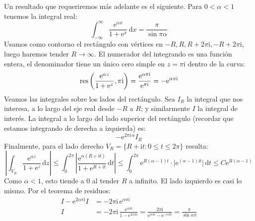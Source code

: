   Un resultado que requeriremos más adelante es el siguiente.
  Para \(0 < \alpha < 1\) tenemos la integral real:
  \begin{equation}
    \label{eq:integral-Gamma(z)Gamma(1-z)}
    \int_{-\infty}^\infty
      \frac{\mathrm{e}^{\alpha x}}{1 + \mathrm{e}^x}
	 \, \mathrm{d} x
      = \frac{\pi}{\sin \pi \alpha}
  \end{equation}
  Usamos como contorno
  el rectángulo con vértices en
  \(-R, R, R + 2 \pi \mathrm{i}, -R + 2 \pi \mathrm{i}\),
  luego haremos tender \(R \rightarrow \infty\).
  El numerador del integrando es una función entera,
  el denominador tiene un único cero simple
  en \(z = \pi \mathrm{i}\)
  dentro de la curva:
  \begin{equation*}
    \operatorname{res} \left(
	   \frac{\mathrm{e}^{\alpha z}}{1 + \mathrm{e}^z},
	   \pi \mathrm{i}
	 \right)
      = \frac{\mathrm{e}^{\alpha \pi \mathrm{i}}}
	     {\mathrm{e}^{\pi \mathrm{i}}}
      = - \mathrm{e}^{\alpha \pi \mathrm{i}}
  \end{equation*}
  Veamos las integrales sobre los lados del rectángulo.
  Sea \(I_R\) la integral que nos interesa,
  a lo largo del eje real desde \(-R\) a \(R\);
  y similarmente \(I\) la integral de interés.
  La integral a lo largo del lado superior del rectángulo
  (recordar que estamos integrando de derecha a izquierda)
  es:
  \begin{equation*}
    - \mathrm{e}^{2 \pi \mathrm{i} \, \alpha} I_R
  \end{equation*}
  Finalmente,
  para el lado derecho
    \(V_R = \{ R + \mathrm{i} t \colon 0 \le t \le 2\pi \}\)
  resulta:
  \begin{equation*}
    \left\lvert
      \int_{V_R}
	\frac{\mathrm{e}^{\alpha z}}{1 + \mathrm{e}^z}
	\, \mathrm{d} z
    \right\rvert
      \le \int_0^{2 \pi}
	    \left\lvert
	      \frac{\mathrm{e}^{\alpha (R + \mathrm{i} t)}}
		   {1 + \mathrm{e}^{R + \mathrm{i} t}}
	      \, \mathrm{d} t
	    \right\rvert
      \le \int_0^{2 \pi}
	    \mathrm{e}^{R (\alpha - 1) t}
	      \cdot \lvert \mathrm{e}^{(\alpha - 1) \mathrm{i} t}
	    \rvert
	    \, \mathrm{d} t
      \le C \mathrm{e}^{R (\alpha - 1)}
  \end{equation*}
  Como \(\alpha < 1\),
  esto tiende a \(0\) al tender \(R\) a infinito.
  El lado izquierdo es casi lo mismo.
  Por el teorema de residuos:
  \begin{align*}
    I - \mathrm{e}^{2 \alpha \pi \mathrm{i}} I
      &= - 2 \pi \mathrm{i} \, \mathrm{e}^{\alpha \pi \mathrm{i}} \\
    I
      &= - 2 \pi \mathrm{i} \,
	   \frac{\mathrm{e}^{\alpha \pi \mathrm{i}}}
		{1 - \mathrm{e}^{2 \alpha \pi \mathrm{i}}}
       = \frac{2 \pi \mathrm{i}}
	      {\mathrm{e}^{\alpha \pi \mathrm{i}}
		 - \mathrm{e}^{- \alpha \pi \mathrm{i}}}
       = \frac{\pi}{\sin \alpha \pi}
  \end{align*}

